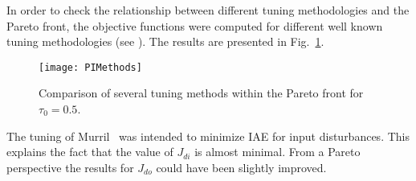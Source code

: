 
In order to check the relationship between different tuning methodologies and the Pareto front, the objective functions were computed for different well known tuning methodologies (see \cite{ODwyer2000,Astrom1995,Murril1967,Rovira1969,Grimholt2012, Smith1985, Ziegler1942}). The results are presented in Fig.~\ref{fig:PIMethods}. 
\begin{figure}%
	\centering
	\texttt{[image: PIMethods]}%
	\caption{Comparison of several tuning methods within the Pareto front for $\tau_0=0.5$.}%
	\label{fig:PIMethods}%
\end{figure}
%
The tuning of Murril~\cite{Murril1967} was intended to minimize IAE for input disturbances. This explains the fact that the value of $J_{di}$ is almost minimal. From a Pareto perspective the results for $J_{do}$ could have been slightly improved.%

